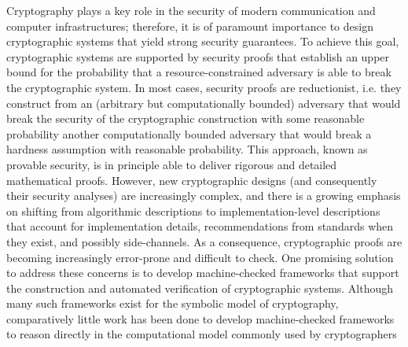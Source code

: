 \documentclass[runningheads,a4paper]{llncs}
\begin{document}
Cryptography plays a key role in the security of modern communication and computer infrastructures; therefore, it is of paramount importance to design cryptographic systems that yield strong security guarantees. To achieve this goal, cryptographic systems are supported by security proofs that establish an upper bound for the probability that a resource-constrained adversary is able to break the cryptographic system. In most cases, security proofs are reductionist, i.e. they construct from an (arbitrary but computationally bounded) adversary that would break the security of the cryptographic construction with some reasonable probability another computationally bounded adversary that would break a hardness assumption with reasonable probability. This approach, known as provable security, is in principle able to deliver rigorous and detailed mathematical proofs. However, new cryptographic designs (and consequently their security analyses) are increasingly complex, and there is a growing emphasis on shifting from algorithmic descriptions to implementation-level descriptions that account for implementation details, recommendations from standards when they exist, and possibly side-channels. As a consequence, cryptographic proofs are becoming increasingly error-prone and difficult to check. One promising solution to address these concerns is to develop machine-checked frameworks that support the construction and automated verification of cryptographic systems. Although many such frameworks exist for the symbolic model of cryptography, comparatively little work has been done to develop machine-checked frameworks to reason directly in the computational model commonly used by cryptographers
\end{document}
